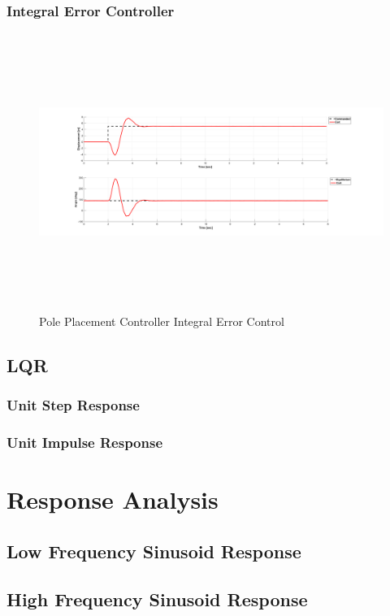 \documentclass[titlepage]{article}
\begin{document}
\subsubsection{Integral Error Controller}
\begin{figure}[H]
\center
\includegraphics[width=15cm, height=9cm]{pole_placement_integral_error.png}
\caption{Pole Placement Controller Integral Error Control}
\end{figure}

\subsection{LQR}
\subsubsection{Unit Step Response}
\subsubsection{Unit Impulse Response}

\newpage
\section{Response Analysis}

\subsection{Low Frequency Sinusoid Response}

\subsection{High Frequency Sinusoid Response}
\end{document}
